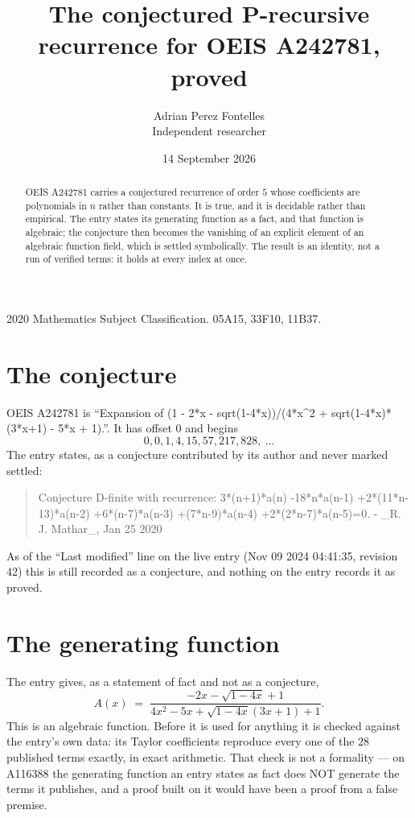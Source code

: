 \documentclass[11pt,a4paper]{article}
\title{The conjectured P-recursive recurrence for OEIS A242781, proved}
\author{Adrian Perez Fontelles\\ \small Independent researcher}
\date{14 September 2026}
\theoremstyle{plain}
\theoremstyle{definition}
\begin{document}
\maketitle

\begin{abstract}
OEIS A242781 carries a conjectured recurrence of order $5$ whose coefficients are polynomials in
$n$ rather than constants. It is true, and it is decidable rather than empirical. The entry
states its generating function as a fact, and that function is algebraic; the conjecture then
becomes the vanishing of an explicit element of an algebraic function field, which is settled
symbolically. The result is an identity, not a run of verified terms: it holds at every index
at once.
\end{abstract}

\noindent\small 2020 Mathematics Subject Classification. 05A15, 33F10, 11B37.\normalsize

\section{The conjecture}

OEIS A242781 is ``Expansion of (1 - 2*x - sqrt(1-4*x))/(4*x\^{}2 + sqrt(1-4*x)*(3*x+1) - 5*x + 1).''. It has offset $0$ and begins
\[
0, 0, 1, 4, 15, 57, 217, 828,\ \dots
\]
The entry states, as a conjecture contributed by its author and never marked settled:
\begin{quote}\raggedright\small
Conjecture D-finite with recurrence: 3*(n+1)*a(n) -18*n*a(n-1) +2*(11*n-13)*a(n-2) +6*(n-7)*a(n-3) +(7*n-9)*a(n-4) +2*(2*n-7)*a(n-5)=0. - \_R. J. Mathar\_, Jan 25 2020
\end{quote}
As of the ``Last modified'' line on the live entry (Nov 09 2024 04:41:35, revision 42)
this is still recorded as a conjecture, and nothing on the entry records it as proved.

\section{The generating function}

The entry gives, as a statement of fact and not as a conjecture,
\[
A(x)\;=\;\frac{- 2 x - \sqrt{1 - 4 x} + 1}{4 x^{2} - 5 x + \sqrt{1 - 4 x} \left(3 x + 1\right) + 1} .
\]
This is an algebraic function. Before it is used for anything it is checked against the entry's
own data: its Taylor coefficients reproduce every one of the $28$ published terms
exactly, in exact arithmetic. That check is not a formality --- on A116388 the generating
function an entry states as fact does NOT generate the terms it publishes, and a proof built on
it would have been a proof from a false premise.
\end{document}
